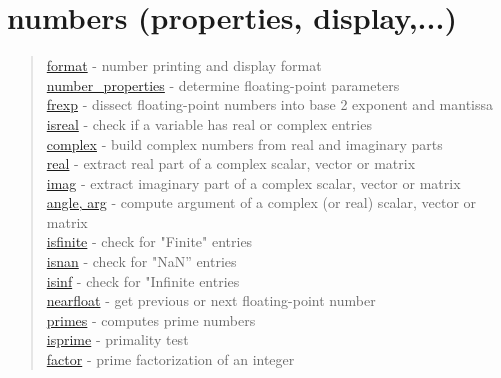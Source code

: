 \chapter*{numbers (properties, display,...)} 


\begin{quote}
\noindent
\hyperlink{format}{format} - number printing and display format\\
\hyperlink{number_properties}{number\_properties} - determine floating-point parameters \\
\hyperlink{frexp}{frexp} - dissect floating-point numbers into base 2 exponent and mantissa\\
\hyperlink{isreal}{isreal} - check if a variable has real or complex entries\\
\hyperlink{complex}{complex} - build complex numbers from real and imaginary parts\\
\hyperlink{real}{real} - extract real part of a complex scalar, vector or matrix\\
\hyperlink{imag}{imag} - extract imaginary part of a complex scalar, vector or matrix\\
\hyperlink{angle, arg}{angle, arg} - compute argument of a complex (or real) scalar, vector or matrix\\
\hyperlink{isfinite}{isfinite} - check for "Finite" entries \\
\hyperlink{isnan}{isnan} - check for "NaN'' entries \\
\hyperlink{isnan}{isinf} - check for "Infinite entries \\
\hyperlink{nearfloat}{nearfloat} - get previous or next floating-point number\\
\hyperlink{primes}{primes} - computes prime numbers\\
\hyperlink{isprime}{isprime} - primality test\\
\hyperlink{factor}{factor} - prime factorization of an integer\\
\end{quote}





 
 
 
 
 
 
 
 

